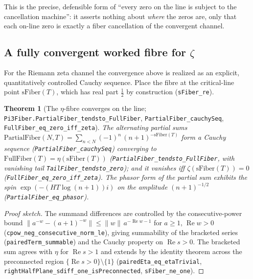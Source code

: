 \documentclass[11pt]{article}
\newtheorem{theorem}[definition]{Theorem}
\DeclareMathOperator{\Ree}{Re}
\newcommand{\code}[1]{\texttt{#1}}
\begin{document}
This is the precise, defensible form of ``every zero on the line is subject to the cancellation
machine'': it asserts nothing about \emph{where} the zeros are, only that each on-line zero is exactly
a fiber cancellation of the convergent channel.

\subsection{A fully convergent worked fibre for $\zeta$}\label{sub:fullfiber}

For the Riemann zeta channel the convergence above is realized as an explicit, quantitatively
controlled Cauchy sequence. Place the fibre at the critical-line point $\mathrm{sFiber}(T)$, which has
real part $\tfrac12$ by construction (\code{sFiber\_re}).

\begin{theorem}[The $\eta$-fibre converges on the line; \code{Pi3Fiber.PartialFiber\_tendsto\_FullFiber}, \code{PartialFiber\_cauchySeq}, \code{FullFiber\_eq\_zero\_iff\_zeta}]\label{thm:fullfiber}
The alternating partial sums
$\mathrm{PartialFiber}(N,T)=\sum_{n<N}(-1)^{n}\,(n+1)^{-\mathrm{sFiber}(T)}$ form a Cauchy sequence
(\code{PartialFiber\_cauchySeq}) converging to $\mathrm{FullFiber}(T)=\eta(\mathrm{sFiber}(T))$
(\code{PartialFiber\_tendsto\_FullFiber}, with vanishing tail \code{TailFiber\_tendsto\_zero}); and it
vanishes \emph{iff} $\zeta(\mathrm{sFiber}(T))=0$ (\code{FullFiber\_eq\_zero\_iff\_zeta}). The phasor form
of the partial sum exhibits the spin $\exp(-(HT\log(n+1))i)$ on the amplitude $(n+1)^{-1/2}$
(\code{PartialFiber\_eq\_phasor}).
\end{theorem}

\begin{proof}[Proof sketch]
The summand differences are controlled by the consecutive-power bound
$\bigl\|a^{-w}-(a+1)^{-w}\bigr\|\le\|w\|\,a^{-\Ree w-1}$ for $a\ge1$, $\Ree w>0$
(\code{cpow\_neg\_consecutive\_norm\_le}), giving summability of the bracketed series
(\code{pairedTerm\_summable}) and the Cauchy property on $\Ree s>0$. The bracketed sum agrees with
$\eta$ for $\Ree s>1$ and extends by the identity theorem across the preconnected region
$\{\Ree s>0\}\setminus\{1\}$ (\code{pairedEta\_eq\_etaTrivial},
\code{rightHalfPlane\_sdiff\_one\_isPreconnected}, \code{sFiber\_ne\_one}).
\end{proof}
\end{document}
